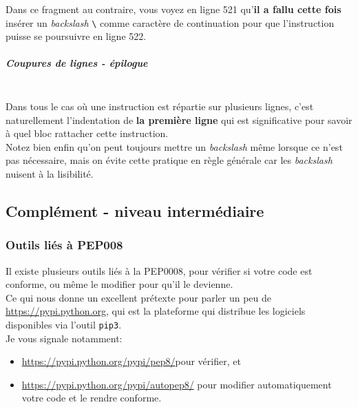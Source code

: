     Dans ce fragment au contraire, vous voyez en ligne 521 qu'\textbf{il a
fallu cette fois} insérer un \emph{backslash} \texttt{\textbackslash{}}
comme caractère de continuation pour que l'instruction puisse se
poursuivre en ligne 522.

    \hypertarget{coupures-de-lignes---uxe9pilogue}{%
\subparagraph{Coupures de lignes -
épilogue\\\\}\label{coupures-de-lignes---uxe9pilogue}}

    Dans tous le cas où une instruction est répartie sur plusieurs lignes,
c'est naturellement l'indentation de \textbf{la première ligne} qui est
significative pour savoir à quel bloc rattacher cette instruction.\\

    Notez bien enfin qu'on peut toujours mettre un \emph{backslash} même
lorsque ce n'est pas nécessaire, mais on évite cette pratique en règle
générale car les \emph{backslash} nuisent à la lisibilité.

    \hypertarget{compluxe9ment---niveau-intermuxe9diaire}{%
\subsection{Complément - niveau
intermédiaire}\label{compluxe9ment---niveau-intermuxe9diaire}}

    \hypertarget{outils-liuxe9s-uxe0-pep008}{%
\subsubsection{Outils liés à PEP008}\label{outils-liuxe9s-uxe0-pep008}}

Il existe plusieurs outils liés à la PEP0008, pour vérifier si votre
code est conforme, ou même le modifier pour qu'il le devienne.\\

Ce qui nous donne un excellent prétexte pour parler un peu de
\href{https://pypi.python.org}{https://pypi.python.org}, qui est la plateforme qui distribue les
logiciels disponibles via l'outil \texttt{pip3}.\\

Je vous signale notamment:

\begin{itemize}
\tightlist
\item
  \href{https://pypi.python.org/pypi/pep8/}{https://pypi.python.org/pypi/pep8/}pour vérifier, et
\item
  \href{https://pypi.python.org/pypi/autopep8/}{https://pypi.python.org/pypi/autopep8/} pour modifier automatiquement
  votre code et le rendre conforme.
\end{itemize}

